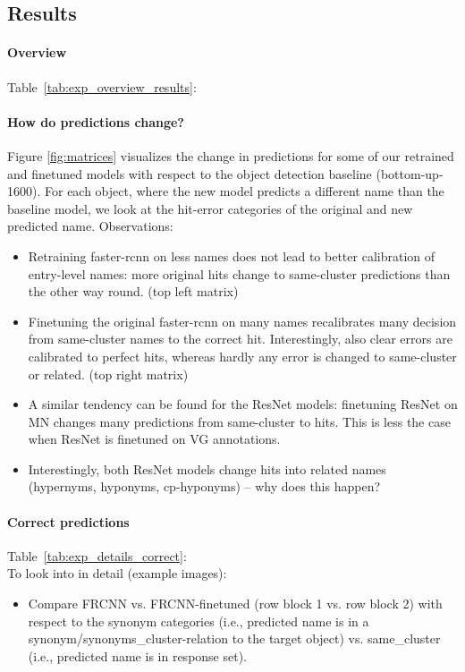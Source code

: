\subsection{Results}

\paragraph{Overview}
Table\ \ref{tab:exp_overview_results}: 

\paragraph{How do predictions change?} Figure \ref{fig:matrices} visualizes the change in predictions for  some of our retrained and finetuned models with respect to the object detection baseline (bottom-up-1600). For each object, where the new model predicts a different name than the baseline model, we look at the hit-error categories of the original and new predicted name. Observations:
\begin{itemize}
\item Retraining faster-rcnn on less names does not lead to better calibration of entry-level names: more original hits change to same-cluster predictions than the other way round. (top left matrix)
\item Finetuning the original faster-rcnn on many names recalibrates many decision from same-cluster names to the correct hit. Interestingly, also clear errors are calibrated to perfect hits, whereas hardly any error is changed to same-cluster or related.  (top right matrix)
\item A similar tendency can be found for the ResNet models: finetuning ResNet on MN changes many predictions from same-cluster to hits. This is less the case when ResNet is finetuned on VG annotations.
\item Interestingly, both ResNet models change hits into related names (hypernyms, hyponyms, cp-hyponyms) -- why does this happen?
\end{itemize}


\paragraph{Correct predictions}
Table\ \ref{tab:exp_details_correct}: \\
To look into in detail (example images): 
\begin{itemize}
	\item Compare FRCNN vs. FRCNN-finetuned (row block 1 vs. row block 2) with respect to the synonym categories (i.e., predicted name is in a synonym/synonyms\_cluster-relation to the target object) vs. same\_cluster (i.e., predicted name is in response set). 
\end{itemize}

